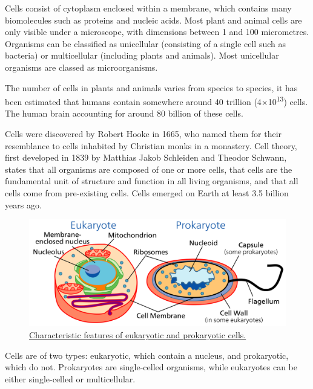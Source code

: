 Cells consist of cytoplasm enclosed within a membrane, which contains many biomolecules such as proteins and nucleic acids. Most plant and animal cells are only visible under a microscope, with dimensions between 1 and 100 micrometres. Organisms can be classified as unicellular (consisting of a single cell such as bacteria) or multicellular (including plants and animals). Most unicellular organisms are classed as microorganisms.

The number of cells in plants and animals varies from species to species, it has been estimated that humans contain somewhere around 40 trillion (4×10\textsuperscript{13}) cells. The human brain accounting for around 80 billion of these cells.

Cells were discovered by Robert Hooke in 1665, who named them for their resemblance to cells inhabited by Christian monks in a monastery. Cell theory, first developed in 1839 by Matthias Jakob Schleiden and Theodor Schwann, states that all organisms are composed of one or more cells, that cells are the fundamental unit of structure and function in all living organisms, and that all cells come from pre-existing cells. Cells emerged on Earth at least 3.5 billion years ago.



\begin{figure}

{\centering \includegraphics[width=0.7\linewidth]{./figures/reproduction/Celltypes} 

}

\caption{\href{htps://en.wikipedia.org/wiki/Cell_(biology)\#/media/File:Celltypes.svg}{Characteristic features of eukaryotic and prokaryotic cells.}}\label{fig:comparison}
\end{figure}

Cells are of two types: eukaryotic, which contain a nucleus, and prokaryotic, which do not. Prokaryotes are single-celled organisms, while eukaryotes can be either single-celled or multicellular.

